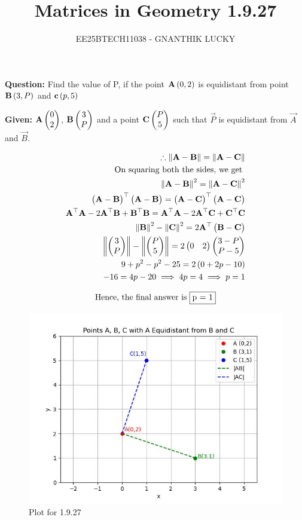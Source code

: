 \documentclass[journal,12pt,onecolumn]{IEEEtran}
\title{Matrices in Geometry 1.9.27}
\author{EE25BTECH11038 - GNANTHIK LUCKY}
\theoremstyle{remark}
\begin{document}
\vspace{3cm}
\maketitle
{\let\newpage\relax\maketitle}
\textbf{Question: }
Find the value of P, if the point $\mathbf{A}\left(0,2\right)$ is equidistant from point $\mathbf{B}\left(3,P\right)$ and $\mathbf{c}\left(p,5\right)$

\textbf{Given: } 
$\mathbf{A}\begin{pmatrix}0\\2\end{pmatrix}$, $\mathbf{B}\begin{pmatrix}3\\P\end{pmatrix}$ and a point $\mathbf{C} \begin{pmatrix}P\\ 5\end{pmatrix}$ such that $\vec{P}$ is equidistant from $\vec{A}$ and $\vec{B}$. 

\begin{align}
    \therefore \left\lVert\mathbf{A}-\mathbf{B}\right\rVert=\left\lVert\mathbf{A}-\mathbf{C}\right\rVert\\
    \text{On squaring both the sides, we get }\\
    \left\lVert\mathbf{A}-\mathbf{B}\right\rVert^2=\left\lVert\mathbf{A}-\mathbf{C}\right\rVert^2\\
    \begin{pmatrix}\mathbf{A}-\mathbf{B}\end{pmatrix}^{\top}\begin{pmatrix}\mathbf{A}-\mathbf{B}\end{pmatrix}=\begin{pmatrix}\mathbf{A}-\mathbf{C}\end{pmatrix}^{\top}\begin{pmatrix}\mathbf{A}-\mathbf{C}\end{pmatrix}\\
    \mathbf{A}^{\top}\mathbf{A} - 2\mathbf{A}^{\top}\mathbf{B} + \mathbf{B}^{\top}\mathbf{B} =\mathbf{A}^{\top}\mathbf{A} - 2\mathbf{A}^{\top}\mathbf{C} + \mathbf{C}^{\top}\mathbf{C}\\
    \left\lVert\mathbf{B}\right\rVert^2 - \left\lVert\mathbf{C}\right\rVert^2=2\mathbf{A}^{\top}\begin{pmatrix}\mathbf{B}-\mathbf{C}\end{pmatrix}\\
    \left\lVert\begin{pmatrix}3\\P\end{pmatrix}\right\rVert - \left\lVert\begin{pmatrix}P\\5\end{pmatrix}\right\rVert=2\begin{pmatrix}0 & 2\end{pmatrix}\begin{pmatrix}3-P \\ P-5\end{pmatrix}\\
    9 + p^2 - p^2 -25 = 2\left(0+2p-10\right)\\
    -16=4p - 20 \implies 4p =4 \implies p=1
\end{align}


\begin{align}
 \text{Hence, the final answer is }\fbox{p = 1}   
\end{align}
\begin{figure}[H]
    \centering
    \includegraphics[width=1\columnwidth]{Figs/1.jpg}
    \caption{Plot for 1.9.27}
    \label{fig:placeholder}
\end{figure}
\end{document}
